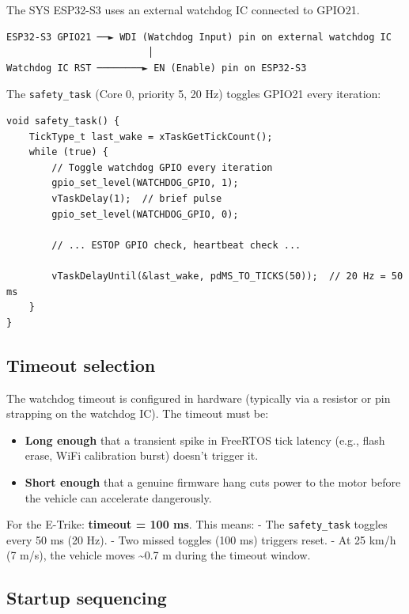 \documentclass[12pt,a4paper,oneside]{report}
\providecommand{\tightlist}{\setlength{\itemsep}{0pt}\setlength{\parskip}{0pt}}
\begin{document}
The SYS ESP32-S3 uses an external watchdog IC connected to GPIO21.

\begin{verbatim}
ESP32-S3 GPIO21 ──► WDI (Watchdog Input) pin on external watchdog IC
                         │
Watchdog IC RST ────────► EN (Enable) pin on ESP32-S3
\end{verbatim}

The \texttt{safety\_task} (Core 0, priority 5, 20 Hz) toggles GPIO21 every
iteration:

\begin{verbatim}
void safety_task() {
    TickType_t last_wake = xTaskGetTickCount();
    while (true) {
        // Toggle watchdog GPIO every iteration
        gpio_set_level(WATCHDOG_GPIO, 1);
        vTaskDelay(1);  // brief pulse
        gpio_set_level(WATCHDOG_GPIO, 0);

        // ... ESTOP GPIO check, heartbeat check ...

        vTaskDelayUntil(&last_wake, pdMS_TO_TICKS(50));  // 20 Hz = 50 ms
    }
}
\end{verbatim}

\subsection{Timeout selection}\label{timeout-selection}

The watchdog timeout is configured in hardware (typically via a resistor or pin
strapping on the watchdog IC). The timeout must be:

\begin{itemize}
\tightlist
\item
  \textbf{Long enough} that a transient spike in FreeRTOS tick latency (e.g.,
  flash erase, WiFi calibration burst) doesn't trigger it.
\item
  \textbf{Short enough} that a genuine firmware hang cuts power to the motor
  before the vehicle can accelerate dangerously.
\end{itemize}

For the E-Trike: \textbf{timeout = 100 ms}. This means: - The
\texttt{safety\_task} toggles every 50 ms (20 Hz). - Two missed toggles (100 ms)
triggers reset. - At 25 km/h (7 m/s), the vehicle moves \textasciitilde0.7 m
during the timeout window.

\subsection{Startup sequencing}\label{startup-sequencing}
\end{document}
